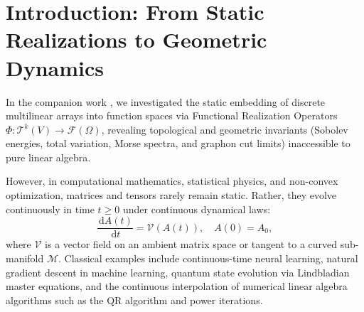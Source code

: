 \documentclass[11pt,a4paper,reqno]{amsart}
\theoremstyle{definition}
\numberwithin{equation}{section}
\newcommand{\dif}{\,\mathrm{d}}
\begin{document}
\section{Introduction: From Static Realizations to Geometric Dynamics}
\label{sec:intro}

In the companion work \cite{silvafilho2026functional}, we investigated the static embedding of discrete multilinear arrays into function spaces via Functional Realization Operators $\Phi \colon \mathcal{T}^k(V) \to \mathcal{F}(\Omega)$, revealing topological and geometric invariants (Sobolev energies, total variation, Morse spectra, and graphon cut limits) inaccessible to pure linear algebra. 

However, in computational mathematics, statistical physics, and non-convex optimization, matrices and tensors rarely remain static. Rather, they evolve continuously in time $t \ge 0$ under continuous dynamical laws:
\begin{equation}
    \label{eq:matrix_ode_general}
    \frac{\dif A(t)}{\dif t} = \mathcal{V}(A(t)), \quad A(0) = A_0,
\end{equation}
where $\mathcal{V}$ is a vector field on an ambient matrix space or tangent to a curved sub-manifold $\mathcal{M}$. Classical examples include continuous-time neural learning, natural gradient descent in machine learning, quantum state evolution via Lindbladian master equations, and the continuous interpolation of numerical linear algebra algorithms such as the QR algorithm and power iterations.
\end{document}
